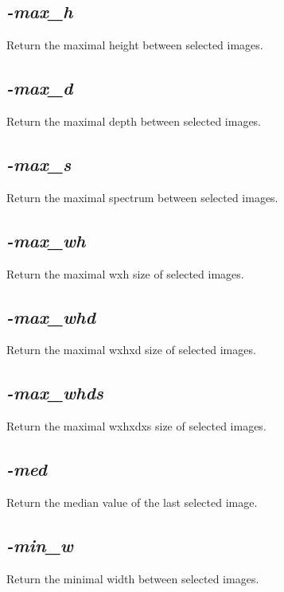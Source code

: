 \documentclass[a4paper,11pt,twoside]{book}
\begin{document}
\subsection{\emph{-max\_h} }\vspace*{-0.5em}
Return the maximal height between selected images.


\subsection{\emph{-max\_d} }\vspace*{-0.5em}
Return the maximal depth between selected images.


\subsection{\emph{-max\_s} }\vspace*{-0.5em}
Return the maximal spectrum between selected images.


\subsection{\emph{-max\_wh} }\vspace*{-0.5em}
Return the maximal wxh size of selected images.


\subsection{\emph{-max\_whd} }\vspace*{-0.5em}
Return the maximal wxhxd size of selected images.


\subsection{\emph{-max\_whds} }\vspace*{-0.5em}
Return the maximal wxhxdxs size of selected images.


\subsection{\emph{-med} }\vspace*{-0.5em}
Return the median value of the last selected image.


\subsection{\emph{-min\_w} }\vspace*{-0.5em}
Return the minimal width between selected images.
\end{document}
